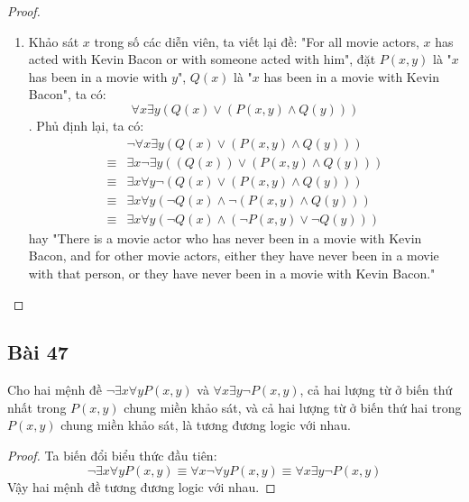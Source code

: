 \begin{proof}
\begin{enumerate}[label=\alph*)]
        \item Khảo sát $x$ trong số các diễn viên, ta viết lại đề: "For all movie actors, $x$ has acted with Kevin Bacon or with someone acted with him", đặt $P(x,y)$ là "$x$ has been in a movie with $y$", $Q(x)$ là "$x$ has been in a movie with Kevin Bacon", ta có: $$\forall x\exists y(Q(x)\lor (P(x,y)\land Q(y)))$$.
        Phủ định lại, ta có:\begin{align*}
            &\neg\forall x\exists y(Q(x)\lor (P(x,y)\land Q(y)))\\
            \equiv& \exists x\neg \exists y((Q(x))\lor (P(x,y)\land Q(y)))\\
            \equiv& \exists x\forall y\neg(Q(x)\lor (P(x,y)\land Q(y)))\\
            \equiv& \exists x\forall y(\neg Q(x)\land \neg(P(x,y)\land Q(y)))\\
            \equiv& \exists x\forall y(\neg Q(x)\land (\neg P(x,y)\lor \neg Q(y)))
        \end{align*} hay "There is a movie actor who has never been in a movie with Kevin Bacon, and for other movie actors, either they have never been in a movie with that person, or they have never been in a movie with Kevin Bacon."
    \end{enumerate}
\end{proof}
\subsection*{Bài 47}
Cho hai mệnh đề $\neg\exists x\forall yP(x,y)$ và $\forall x\exists y\neg P(x,y)$, cả hai lượng từ ở biến thứ nhất trong $P(x,y)$ chung miền khảo sát, và cả hai lượng từ ở biến thứ hai trong $P(x,y)$ chung miền khảo sát, là tương đương logic với nhau.
\begin{proof}
    Ta biến đổi biểu thức đầu tiên:
    $$\neg\exists x\forall yP(x,y)\equiv\forall x\neg\forall yP(x,y)\equiv\forall x\exists y\neg P(x,y)$$
    Vậy hai mệnh đề tương đương logic với nhau.
\end{proof}
